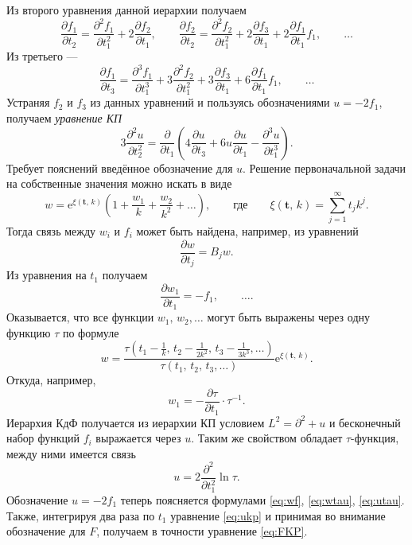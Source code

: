 \documentclass[a4paper,14pt]{extarticle}
\numberwithin{equation}{section}
\begin{document}
Из второго уравнения данной иерархии получаем
\begin{equation}
\frac{\partial f_1}{\partial t_2} =
\frac{\partial ^2 f_1}{\partial t_1^2} +
2 \frac{\partial f_2}{\partial t_1} ,\qquad
\frac{\partial f_2}{\partial t_2} =\frac{\partial^2
f_2}{\partial t_1^2}+ 2 \frac{\partial f_3}{\partial t_1} 
+2 \frac{\partial f_1}{\partial t_1} f_1
,\qquad\ldots\end{equation} 
Из третьего --- 
\begin{equation}
\frac{\partial f_1}{\partial t_3} =
\frac{\partial ^3f_1}{\partial t_1^3} +3 \frac{\partial ^2f_2}{\partial t_1^2} +3 \frac{\partial f_3}{\partial t_1} 
+6 \frac{\partial f_1}{\partial t_1} f_1
,\qquad\ldots\end{equation} 
Устраняя $f_2$ и $f_3$ из данных уравнений и
пользуясь обозначениями  $u=-2f_1$, получаем
\emph{уравнение КП}
\begin{equation}
3 \frac{\partial ^2 u}{\partial t_2^2} =
\frac{\partial }{\partial t_1} \left( 
4 \frac{\partial u}{\partial t_3} +6 u \frac{\partial u}{\partial t_1} -\frac{\partial ^3u}{\partial t_1^3} \right) 
\label{eq:ukp}
.\end{equation} 
Требует пояснений введённое обозначение для $u$.
Решение первоначальной задачи на собственные значения
можно искать в виде
\begin{equation}
	w=\mathrm{e} ^{\xi\left( \mathbf{t},\,k \right) }\left( 1+ \frac{w_1}{k}+\frac{w_2}{k^2}+\ldots \right) ,\qquad \text{где}\qquad \xi\left( \mathbf{t},\,k \right) =
	\sum_{j=1}^{\infty} t_j k^j
.\end{equation} 
Тогда связь между $w_i$ и $f_i$ может быть найдена, например, из уравнений
\begin{equation}
\frac{\partial w}{\partial t_j} =B_j w
.\end{equation} 
Из уравнения на $t_1$ получаем
\begin{equation}
\frac{\partial w_1}{\partial t_1} =-f_1,\qquad\ldots
\label{eq:wf}
.\end{equation} 
Оказывается, что все функции $w_1,\,w_2,\ldots$ могут
быть выражены через одну функцию $\tau$ по формуле
\begin{equation}
	w=\frac{\displaystyle \tau\left( t_1- \frac{1}{k},\,t_2-\frac{1}{2k^2},\,t_3 -\frac{1}{3k^3},\ldots \right) }{\tau\left( t_1,\,t_2,\,t_3,\ldots \right) }
	\mathrm{e} ^{\xi\left( \mathbf{t},\,k \right) }
.\end{equation} 
Откуда, например,
\begin{equation}
w_1=-\frac{\partial \tau}{\partial t_1} \cdot \tau^{-1}
\label{eq:wtau}
.\end{equation} 
Иерархия КдФ получается из иерархии КП условием $L^2=\partial^2+u$ и бесконечный набор функций  $f_i$ выражается через $u$. Таким же свойством обладает
$\tau$-функция, между ними имеется связь
\begin{equation}
u= 2\frac{\partial ^2}{\partial t_1^2} \ln \tau
\label{eq:utau}
.\end{equation} 
Обозначение $u=-2f_1$ теперь поясняется формулами
\eqref{eq:wf}, \eqref{eq:wtau}, \eqref{eq:utau}.
Также, интегрируя два раза по $t_1$ уравнение  \eqref{eq:ukp} и принимая во внимание обозначение для $F$, получаем
в точности уравнение \eqref{eq:FKP}.
\end{document}
